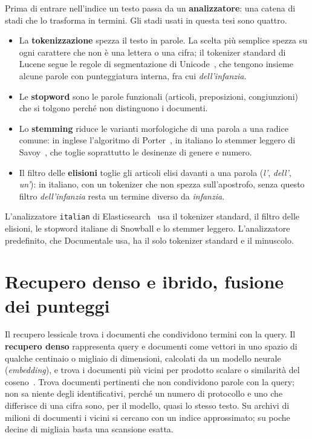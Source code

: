 Prima di entrare nell'indice un testo passa da un \textbf{analizzatore}: una
catena di stadi che lo trasforma in termini. Gli stadi usati in questa tesi sono
quattro.
\begin{itemize}
  \item La \textbf{tokenizzazione} spezza il testo in parole. La scelta più
        semplice spezza su ogni carattere che non è una lettera o una cifra; il
        tokenizer standard di Lucene segue le regole di segmentazione di
        Unicode~\cite{uax29}, che tengono insieme alcune parole con punteggiatura
        interna, fra cui \emph{dell'infanzia}.
  \item Le \textbf{stopword} sono le parole funzionali (articoli, preposizioni,
        congiunzioni) che si tolgono perché non distinguono i documenti.
  \item Lo \textbf{stemming} riduce le varianti morfologiche di una parola a una
        radice comune: in inglese l'algoritmo di Porter~\cite{porter1980}, in
        italiano lo stemmer leggero di Savoy~\cite{savoy2002light}, che toglie
        soprattutto le desinenze di genere e numero.
  \item Il filtro delle \textbf{elisioni} toglie gli articoli elisi davanti a una
        parola (\emph{l'}, \emph{dell'}, \emph{un'}): in italiano, con un
        tokenizer che non spezza sull'apostrofo, senza questo filtro
        \emph{dell'infanzia} resta un termine diverso da \emph{infanzia}.
\end{itemize}
L'analizzatore \texttt{italian} di Elasticsearch~\cite{es-italian} usa il
tokenizer standard, il filtro delle elisioni, le stopword italiane di Snowball e
lo stemmer leggero. L'analizzatore predefinito, che Documentale usa, ha il solo
tokenizer standard e il minuscolo.

\section{Recupero denso e ibrido, fusione dei punteggi}\label{sec:denso}

Il recupero lessicale trova i documenti che condividono termini con la query. Il
\textbf{recupero denso} rappresenta query e documenti come vettori in uno spazio
di qualche centinaio o migliaio di dimensioni, calcolati da un modello neurale
(\emph{embedding}), e trova i documenti più vicini per prodotto scalare o
similarità del coseno~\cite{karpukhin2020dpr}. Trova documenti pertinenti che non condividono
parole con la query; non sa niente degli identificativi, perché un numero di
protocollo e uno che differisce di una cifra sono, per il modello, quasi lo stesso
testo. Su archivi di milioni di documenti i vicini si cercano con un indice
approssimato; su poche decine di migliaia basta una scansione esatta.

